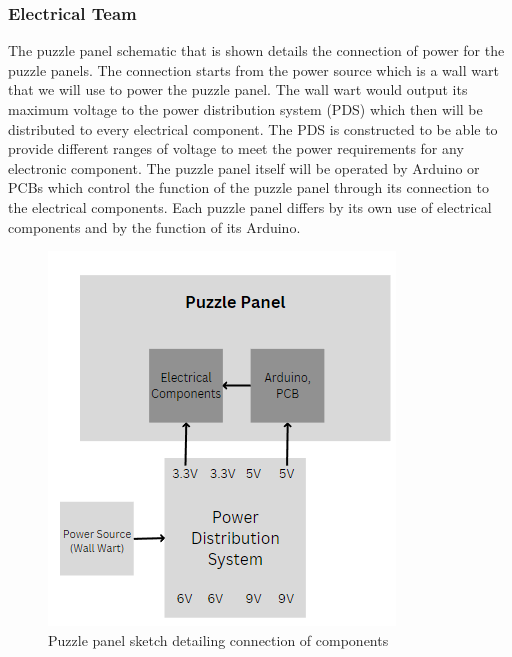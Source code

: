 \documentclass[a4paper, 10pt]{article}
\begin{document}
\pagebreak

		\subsubsection{Electrical Team}
		The puzzle panel schematic that is shown details the connection of power for the puzzle panels. The connection starts from the power source which is a wall wart that we will use to power the puzzle panel. The wall wart would output its maximum voltage to the power distribution system (PDS) which then will be distributed to every electrical component. The PDS is constructed to be able to provide different ranges of voltage to meet the power requirements for any electronic component. The puzzle panel itself will be operated by Arduino or PCBs which control the function of the puzzle panel through its connection to the electrical components. Each puzzle panel differs by its own use of electrical components and by the function of its Arduino. 
	
		\begin{figure} [!h]
			\centering
			\includegraphics[scale=0.8]{Photos/Puzzle panel simplified}
			\caption{Puzzle panel sketch detailing connection of components}
			\label{puzzle_panel_schema}
		\end{figure}
		
\end{document}
